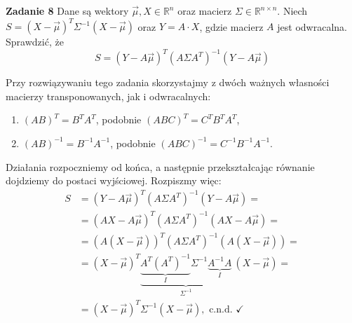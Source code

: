 \documentclass[a4paper,12pt]{article}
\begin{document}
\noindent \textbf{Zadanie 8} \newline
Dane są wektory $\vec{\mu}, X \in \mathbb{R}^n$ oraz macierz $\Sigma \in 
\mathbb{R}^{n \times n}$. Niech $S = (X - \vec{\mu})^T \Sigma^{-1} (X - \vec{\mu})$
oraz $Y = A \cdot X$, gdzie macierz $A$ jest odwracalna. Sprawdzić, że
\[
    S = (Y - A\vec{\mu})^T \left(A \Sigma A^T\right)^{-1} (Y - A\vec{\mu})
\]

\noindent Przy rozwiązywaniu tego zadania skorzystajmy z dwóch ważnych własności
macierzy transponowanych, jak i odwracalnych:
\begin{enumerate}
    \item $(AB)^T = B^T A^T$, podobnie $(ABC)^T = C^T B^T A^T$,
    \item $(AB)^{-1} = B^{-1} A^{-1}$, podobnie $(ABC)^{-1} = C^{-1} B^{-1} A^{-1}$.
\end{enumerate}

\noindent Działania rozpoczniemy od końca, a następnie przekształcając równanie
dojdziemy do postaci wyjściowej. Rozpiszmy więc:
\begin{align*}
    S   &= (Y - A\vec{\mu})^T \left(A \Sigma A^T\right)^{-1} (Y - A\vec{\mu}) = \\
        &= (A X - A\vec{\mu})^T \left(A \Sigma A^T\right)^{-1} (A X - A\vec{\mu}) = \\
        &= (A (X - \vec{\mu}))^T \left(A \Sigma A^T\right)^{-1} (A (X - \vec{\mu})) = \\
        &= (X - \vec{\mu})^T \underbrace{
            \underbrace{A^T (A^T)^{-1}}_{I}
            \Sigma^{-1}
            \underbrace{A^{-1} A}_{I}
        }_{\Sigma^{-1}} \ (X - \vec{\mu}) = \\
        &= (X - \vec{\mu})^T \Sigma^{-1} (X - \vec{\mu}),
            \text{ c.n.d. } \checkmark
\end{align*}
\end{document}
